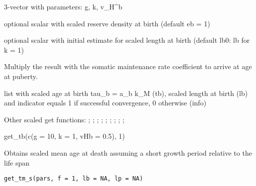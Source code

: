 \documentclass[a4paper]{book}
\begin{document}
%
\begin{Arguments}
\begin{ldescription}
\item[\code{pars}] 3-vector with parameters: g, k, v\_H\textasciicircum{}b

\item[\code{eb}] optional scalar with scaled reserve density at birth (default eb = 1)

\item[\code{lb0}] optional scalar with initial estimate for scaled length at birth (default lb0: lb for k = 1)
\end{ldescription}
\end{Arguments}
%
\begin{Details}\relax
Multiply the result with the somatic maintenance rate coefficient to arrive at age at puberty.
\end{Details}
%
\begin{Value}
list with scaled age at birth tau\_b = a\_b k\_M (tb), scaled length at birth (lb)
and indicator equals 1 if successful convergence, 0 otherwise (info)
\end{Value}
%
\begin{SeeAlso}\relax
Other scaled get functions: ;
; ;
; ;
; ;
;
;
\end{SeeAlso}
%
\begin{Examples}
\begin{ExampleCode}
get_tb(c(g = 10, k = 1, vHb = 0.5), 1)
\end{ExampleCode}
\end{Examples}
%
\begin{Description}\relax
Obtains scaled mean age at death assuming a short growth period relative to the life span
\end{Description}
%
\begin{Usage}
\begin{verbatim}
get_tm_s(pars, f = 1, lb = NA, lp = NA)
\end{verbatim}
\end{Usage}
\end{document}
